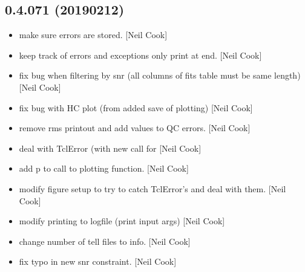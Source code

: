\documentclass[a4paper,10pt,english]{report}
\begin{document}
\subsection{0.4.071 (2019\sphinxhyphen{}02\sphinxhyphen{}12)}
\label{\detokenize{misc/changelog:id205}}\begin{itemize}
\item {} 
 \sphinxhyphen{} make sure  errors are stored. {[}Neil
Cook{]}

\item {} 
 \sphinxhyphen{} keep track of errors and exceptions \sphinxhyphen{} only print
at end. {[}Neil Cook{]}

\item {} 
 \sphinxhyphen{} fix bug when filtering by snr (all columns of
fits table must be same length) {[}Neil Cook{]}

\item {} 
 \sphinxhyphen{} fix bug with HC plot (from added save of plotting)
{[}Neil Cook{]}

\item {} 
 \sphinxhyphen{} remove rms printout and add values to QC
errors. {[}Neil Cook{]}

\item {} 
 \sphinxhyphen{} deal with TclError (with new call for 
{[}Neil Cook{]}

\item {} 
 \sphinxhyphen{} add p to call to plotting function. {[}Neil
Cook{]}

\item {} 
 \sphinxhyphen{} modify figure setup to try to catch TclError’s and
deal with them. {[}Neil Cook{]}

\item {} 
 \sphinxhyphen{} modify printing to logfile (print input args)
{[}Neil Cook{]}

\item {} 
 \sphinxhyphen{} change number of tell files to info. {[}Neil
Cook{]}

\item {} 
 \sphinxhyphen{} fix typo in new snr constraint. {[}Neil Cook{]}


\end{itemize}
\end{document}
